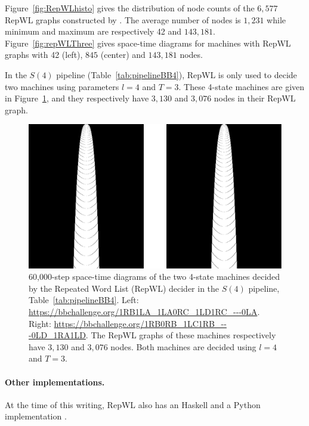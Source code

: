 Figure~\ref{fig:RepWLhisto} gives the distribution of node counts of the ${6,577}$ RepWL graphs constructed by \CoqBB. The average number of nodes is $1{,}231$ while minimum and maximum are respectively 42 and $143{,}181$. Figure~\ref{fig:repWLThree} gives space-time diagrams for machines with RepWL graphs with 42 (left), ${845}$ (center) and $143{,}181$ nodes. 

In the $S(4)$ pipeline (Table~\ref{tab:pipelineBB4}), RepWL is only used to decide two machines using parameters $l=4$ and $T=3$. These 4-state machines are given in Figure~\ref{fig:RepWLBB4}, and they respectively have $3{,}130$ and $3{,}076$ nodes in their RepWL graph.

\begin{figure}[h!]
    \centering
    \includegraphics[scale=0.48]{figures/RepWL/RepWL_BB4_two_machines.pdf}
    \caption{60,000-step space-time diagrams of the two 4-state machines decided by the Repeated Word List (RepWL) decider in the $S(4)$ pipeline, Table~\ref{tab:pipelineBB4}. Left: {\small \url{https://bbchallenge.org/1RB1LA_1LA0RC_1LD1RC_---0LA}}. Right: {\small \url{https://bbchallenge.org/1RB0RB_1LC1RB_---0LD_1RA1LD}}. The RepWL graphs of these machines respectively have $3{,}130$ and $3{,}076$ nodes. Both machines are decided using $l=4$ and $T=3$.
    }\label{fig:RepWLBB4}
\end{figure}

\paragraph{Other implementations.} At the time of this writing, RepWL also has an Haskell and a Python implementation \cite{RepWL_haskell,RepWL_python}.